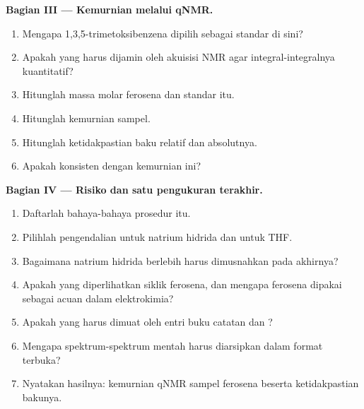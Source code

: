 \begin{problem}
\medskip\noindent\textbf{Bagian III --- Kemurnian melalui qNMR.}
\begin{enumerate}[resume, beginpenalty=10000]
  \item Mengapa 1,3,5-trimetoksibenzena dipilih sebagai standar di sini?
  \item Apakah yang harus dijamin oleh akuisisi NMR agar integral-integralnya kuantitatif?
  \item Hitunglah massa molar ferosena dan standar itu.
  \item Hitunglah kemurnian sampel.
  \item Hitunglah ketidakpastian baku relatif dan absolutnya.
  \item Apakah  konsisten dengan kemurnian ini?
\end{enumerate}

\medskip\noindent\textbf{Bagian IV --- Risiko dan satu pengukuran terakhir.}
\begin{enumerate}[resume, beginpenalty=10000]
  \item Daftarlah bahaya-bahaya prosedur itu.
  \item Pilihlah pengendalian untuk natrium hidrida dan untuk THF.
  \item Bagaimana natrium hidrida berlebih harus dimusnahkan pada akhirnya?
  \item Apakah yang diperlihatkan  siklik ferosena, dan mengapa ferosena dipakai
        sebagai acuan dalam elektrokimia?
  \item Apakah yang harus dimuat oleh entri buku catatan dan ?
  \item Mengapa spektrum-spektrum mentah harus diarsipkan dalam format terbuka?
  \item Nyatakan hasilnya: kemurnian qNMR sampel ferosena beserta ketidakpastian
        bakunya.
\end{enumerate}
\end{problem}
